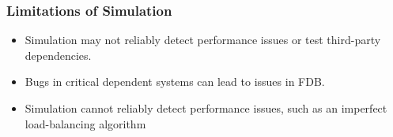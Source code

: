 \begin{frame}
    \frametitle{Limitations of Simulation}
    \begin{itemize}
        \item Simulation may not reliably detect performance issues or test third-party dependencies.
        \item Bugs in critical dependent systems can lead to issues in FDB.
        \item Simulation cannot reliably detect performance issues, such as an imperfect load-balancing algorithm
    \end{itemize}
\end{frame}